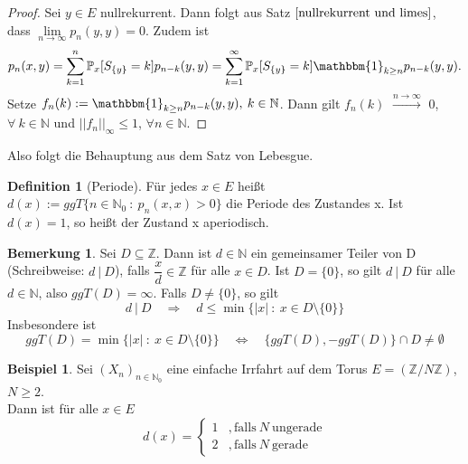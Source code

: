 \documentclass[a4paper,12pt]{scrartcl}
\theoremstyle{definition}
\newtheorem{bem}{Bemerkung}[section]
\newtheorem{bsp}{Beispiel}[section]
\newtheorem{defi}{Definition}[section]
\begin{document}
\begin{proof}
Sei $y \in E$ nullrekurrent. Dann folgt aus Satz $\ref{nullrekurrent und limes}$, dass $\lim \limits_{ n \to \infty} p_{n}(y,y) = 0$. Zudem ist 
\begin{equation*}
p_{n}(x,y) = \sum_{k=1}^{n} \mathbb{P}_{x}[S_{\lbrace y \rbrace} = k] p_{n-k}(y,y) = \sum_{k=1}^{\infty} \mathbb{P}_{x}[S_{\lbrace y \rbrace} = k] \mathbbm{1}_{k \geq n} p_{n-k}(y,y).
\end{equation*}
Setze $f_{n}(k) := \mathbbm{1}_{k \geq n} p_{n-k}(y,y), \: k \in \mathbb{N}$. Dann gilt $f_{n}(k)$ $\stackrel{n \to \infty}{\to}$ 0, $\forall \: k \in \mathbb{N}$ und $\vert \vert f_{n} \vert \vert_{\infty} \leq 1$, $\forall n \in \mathbb{N}$.
\end{proof}
\noindent
Also folgt die Behauptung aus dem Satz von Lebesgue.
\begin{defi}[Periode]
Für jedes $x \in E$ heißt $d(x):=ggT \lbrace n \in \mathbb{N}_{0} \: : \: p_{n}(x,x) > 0  \rbrace$ die Periode des Zustandes x.
Ist $d(x)=1$, so heißt der Zustand x aperiodisch.
\end{defi}
\begin{bem}
\label{Bemerkung zu Teilern}
Sei $D \subseteq \mathbb{Z}$. Dann ist $d \in \mathbb{N}$ ein gemeinsamer Teiler von D (Schreibweise: $d \: \vert \: D$), falls $\dfrac{x}{d} \in \mathbb{Z}$ für alle $x \in D$. Ist $D = \lbrace 0 \rbrace$, so gilt $d \: \vert \: D$ für alle $d \in \mathbb{N}$, also $ggT(D)=\infty$. Falls $D \neq \lbrace 0 \rbrace$, so gilt
\begin{equation*}
d \: \vert \: D \quad \Rightarrow \quad d \leq \min \lbrace \vert x \vert \: : \: x \in D\setminus \lbrace 0 \rbrace \rbrace
\end{equation*}
Insbesondere ist
\begin{equation*}
ggT(D) = \min \lbrace \vert x \vert \: : \: x \in D\setminus \lbrace 0 \rbrace \rbrace \quad \Leftrightarrow \quad \lbrace ggT(D), -ggT(D) \rbrace \cap D \neq \emptyset 
\end{equation*}
\end{bem}
\begin{bsp}
Sei $(X_{n})_{n \in \mathbb{N}_{0}}$ eine einfache Irrfahrt auf dem Torus $E=(\mathbb{Z} / N \mathbb{Z})$, $N \geq 2$.
\\
Dann ist für alle $x \in E$
\begin{equation*}
d(x) =
\begin{cases}
1 & , \mathrm{falls} \: N \: \mathrm{ungerade}\\
2 & , \mathrm{ falls }\: N \: \mathrm{gerade}
\end{cases}
\end{equation*}
\end{bsp}
\end{document}
